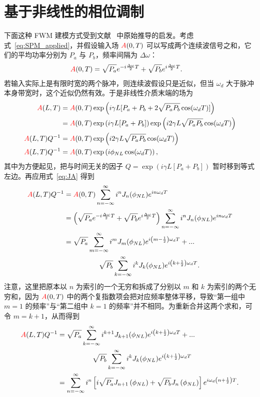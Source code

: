 \section{基于非线性的相位调制}
\label{sec:sidebands}
下面这种 FWM 建模方式受到文献~\cite{Boskovic_Original_Kerr_Effect} 中原始推导的启发。考虑式~\ref{eq:SPM_applied}，并假设输入场 $\textcolor{red}{A}(0,T)$ 可以写成两个连续波信号之和，它们的平均功率分别为 $P_a$ 与 $P_b$，频率间隔为 $\Delta\omega$：
\begin{align}
    \label{eq:FWM_input}
    \textcolor{red}{A}(0,T)&= \sqrt{P_a}e^{-i\frac{\Delta\omega}{2}T}+\sqrt{P_b}e^{i\frac{\Delta\omega}{2}T}.
\end{align}
若输入实际上是有限时宽的两个脉冲，则连续波假设只是近似，但当 $\omega_d$ 大于脉冲本身带宽时，这个近似仍然有效。于是非线性介质末端的场为
\begin{align}
    \textcolor{red}{A}(L,T) &= \textcolor{red}{A}(0,T)\exp\left(i\gamma L [P_a+P_b+2\sqrt{P_aP_b}\cos(\omega_dT)] \right) \\ \nonumber
    &= \textcolor{red}{A}(0,T)\exp\left(i\gamma L [P_a+P_b]\right)\exp\left(i2\gamma L\sqrt{P_aP_b}\cos(\omega_dT) \right)\\ \nonumber
    \textcolor{red}{A}(L,T)Q^{-1}&= \textcolor{red}{A}(0,T)\exp\left(i2\gamma L\sqrt{P_aP_b}\cos(\omega_dT) \right)\\ \nonumber
    \textcolor{red}{A}(L,T)Q^{-1}&= \textcolor{red}{A}(0,T)\exp\left(i\phi_{NL}\cos(\omega_dT) \right),
\end{align}
其中为方便起见，把与时间无关的因子 $Q=\exp(i\gamma L [P_a+P_b])$ 暂时移到等式左边。再应用式~\ref{eq:JA} 得到
\begin{align}
    \textcolor{red}{A}(L,T)Q^{-1}&= \textcolor{red}{A}(0,T)\sum_{n=-\infty}^{\infty}i^nJ_n(\phi_{NL})e^{in\omega_dT} \\ \nonumber
    &=\left(\sqrt{P_a}e^{-i\frac{\Delta\omega}{2}T}+\sqrt{P_b}e^{i\frac{\Delta\omega}{2}T}\right)\sum_{n=-\infty}^{\infty}i^nJ_n(\phi_{NL})e^{in\omega_dT} \\ \nonumber
    &=\sqrt{P_a}\sum_{m=-\infty}^{\infty}i^mJ_m(\phi_{NL})e^{i\left(m-\frac{1}{2}\right)\omega_dT}+...\\ \nonumber & \quad\quad\quad\quad\quad\sqrt{P_b}\sum_{k=-\infty}^{\infty}i^kJ_k(\phi_{NL})e^{i\left(k+\frac{1}{2}\right)\omega_dT}.
\end{align}
注意，这里把原本以 $n$ 为索引的一个无穷和拆成了分别以 $m$ 和 $k$ 为索引的两个无穷和，因为 $\textcolor{red}{A}(0,T)$ 中的两个复指数项会把对应频率整体平移，导致“第一组中 $m=1$ 的频率”与“第二组中 $k=1$ 的频率”并不相同。为重新合并这两个求和，可令 $m=k+1$，从而得到
\begin{align}
\label{eq:re_index}
    \textcolor{red}{A}(L,T)Q^{-1}&=\sqrt{P_a}\sum_{k=-\infty}^{\infty}i^{k+1}J_{k+1}(\phi_{NL})e^{i\left(k+\frac{1}{2}\right)\omega_dT}+...\\ \nonumber & \quad\quad\quad\quad\quad\sqrt{P_b}\sum_{k=-\infty}^{\infty}i^kJ_k(\phi_{NL})e^{i\left(k+\frac{1}{2}\right)\omega_dT} \\ \nonumber
    &= \sum_{n=-\infty}^{\infty} i^n\left[i\sqrt{P_a}J_{n+1}\left(\phi_{NL}\right)+\sqrt{P_b}J_n\left(\phi_{NL}\right)\right]e^{i\omega_d\left(n+\frac{1}{2}\right)T}.
\end{align}

